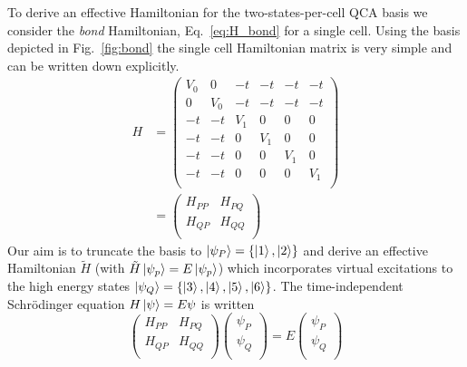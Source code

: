 To derive an effective Hamiltonian for the two-states-per-cell QCA basis we
consider the \emph{bond} Hamiltonian, Eq.~\ref{eq:H_bond} for a single cell.
Using the basis depicted in Fig.~\ref{fig:bond} the single cell Hamiltonian
matrix is very simple and can be written down explicitly.
%
\begin{equation}
\begin{split}
  \label{eq:H_marix}
  H
  &=
  \left(
  \begin{array}{cc|cccc}
    V_0 & 0   & -t  & -t  & -t  & -t  \\
    0   & V_0 & -t  & -t  & -t  & -t  \\
    \hline
    -t  & -t  & V_1 & 0   & 0   & 0   \\
    -t  & -t  & 0   & V_1 & 0   & 0   \\
    -t  & -t  & 0   & 0   & V_1 & 0   \\
    -t  & -t  & 0   & 0   & 0   & V_1 \\
  \end{array}
  \right) \\[1em]
  &=
  \left(
  \begin{array}{cc}
    H_{PP} & H_{PQ} \\
    H_{QP} & H_{QQ} \\
  \end{array}
  \right)
\end{split}
\end{equation}
%
Our aim is to truncate the basis to $\left|\psi_P\right> = \left\{ \left|1\right>, \left|2\right>
\right\}$ and derive an effective Hamiltonian $\tilde{H}$ (with $\tilde{H}
\left|\psi_p\right> = E \left|\psi_p\right>$) which incorporates
virtual excitations to the high energy states $\left|\psi_Q\right> = \left\{ \left|3\right>,
\left|4\right>, \left|5\right>, \left|6\right> \right\}$. The time-independent Schr\"odinger equation
$H \left|\psi\right> = E \psi$ is written
%
\begin{equation}
  \label{eq:SE}
  \begin{pmatrix}
    H_{PP} & H_{PQ} \\
    H_{QP} & H_{QQ} \\
  \end{pmatrix}
  \begin{pmatrix}
    \psi_P \\
    \psi_Q \\
  \end{pmatrix}
  =
  E
  \begin{pmatrix}
    \psi_P \\
    \psi_Q \\
  \end{pmatrix}
\end{equation}
